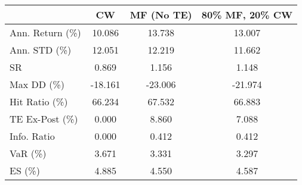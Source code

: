 \begin{tabular}{lccc}
\toprule
{} &      CW &  MF (No TE) &  80\% MF, 20\% CW \\
\midrule
Ann. Return (\%) &  10.086 &      13.738 &          13.007 \\
Ann. STD (\%)    &  12.051 &      12.219 &          11.662 \\
SR              &   0.869 &       1.156 &           1.148 \\
Max DD (\%)      & -18.161 &     -23.006 &         -21.974 \\
Hit Ratio (\%)   &  66.234 &      67.532 &          66.883 \\
TE Ex-Post (\%)  &   0.000 &       8.860 &           7.088 \\
Info. Ratio     &   0.000 &       0.412 &           0.412 \\
VaR (\%)         &   3.671 &       3.331 &           3.297 \\
ES (\%)          &   4.885 &       4.550 &           4.587 \\
\bottomrule
\end{tabular}
